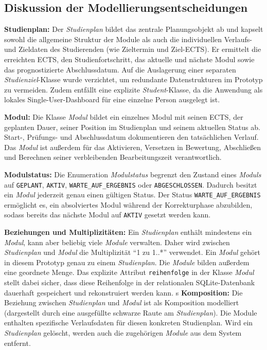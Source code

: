 \documentclass[11pt,a4paper]{article}
\begin{document}
\subsection{Diskussion der Modellierungsentscheidungen}

\textbf{Studienplan:} Der \textit{Studienplan} bildet das zentrale Planungsobjekt ab und kapselt sowohl die allgemeine Struktur der Module als auch die individuellen Verlaufs- und Zieldaten des Studierenden (wie Zieltermin und Ziel-ECTS). Er ermittelt die erreichten ECTS, den Studienfortschritt, das aktuelle und nächste Modul sowie das prognostizierte Abschlussdatum. Auf die Auslagerung einer separaten \textit{Studienziel}-Klasse wurde verzichtet, um redundante Datenstrukturen im Prototyp zu vermeiden. Zudem entfällt eine explizite \textit{Student}-Klasse, da die Anwendung als lokales Single-User-Dashboard für eine einzelne Person ausgelegt ist.

\textbf{Modul:} Die Klasse \textit{Modul} bildet ein einzelnes Modul mit seinen ECTS, der geplanten Dauer, seiner Position im Studienplan und seinem aktuellen Status ab. Start-, Prüfungs- und Abschlussdatum dokumentieren den tatsächlichen Verlauf. Das \textit{Modul} ist außerdem für das Aktivieren, Versetzen in Bewertung, Abschließen und Berechnen seiner verbleibenden Bearbeitungszeit verantwortlich.

\textbf{Modulstatus:} Die Enumeration \textit{Modulstatus} begrenzt den Zustand eines \textit{Moduls} auf \texttt{GEPLANT}, \texttt{AKTIV}, \texttt{WARTE\_AUF\_ERGEBNIS} oder \texttt{ABGESCHLOSSEN}. Dadurch besitzt ein \textit{Modul} jederzeit genau einen gültigen Status. Der Status \texttt{WARTE\_AUF\_ERGEBNIS} ermöglicht es, ein absolviertes Modul während der Korrekturphase abzubilden, sodass bereits das nächste Modul auf \texttt{AKTIV} gesetzt werden kann.

\textbf{Beziehungen und Multiplizitäten:} Ein \textit{Studienplan} enthält mindestens ein \textit{Modul}, kann aber beliebig viele \textit{Module} verwalten. Daher wird zwischen \textit{Studienplan} und \textit{Modul} die Multiplizität \enquote{1 zu 1..*} verwendet. Ein \textit{Modul} gehört in diesem Prototyp genau zu einem \textit{Studienplan}. Die \textit{Module} bilden außerdem eine geordnete Menge. Das explizite Attribut \texttt{reihenfolge} in der Klasse \textit{Modul} stellt dabei sicher, dass diese Reihenfolge in der relationalen SQLite-Datenbank dauerhaft gespeichert und rekonstruiert werden kann.
\newpage
s
\textbf{Komposition:} Die Beziehung zwischen \textit{Studienplan} und \textit{Modul} ist als Komposition modelliert (dargestellt durch eine ausgefüllte schwarze Raute am \textit{Studienplan}). Die Module enthalten spezifische Verlaufsdaten für diesen konkreten Studienplan. Wird ein \textit{Studienplan} gelöscht, werden auch die zugehörigen \textit{Module} aus dem System entfernt.
\end{document}

